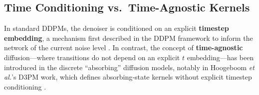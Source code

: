 \subsection{Time Conditioning vs.~Time-Agnostic Kernels}
In standard DDPMs, the denoiser is conditioned on an explicit \textbf{timestep embedding}, a mechanism first described in the DDPM framework to inform the network of the current noise level \cite{ho_denoising_2020}.  In contrast, the concept of \textbf{time-agnostic} diffusion—where transitions do not depend on an explicit $t$ embedding—has been introduced in the discrete “absorbing” diffusion models, notably in Hoogeboom \emph{et al.}’s D3PM work, which defines absorbing‐state kernels without explicit timestep conditioning \cite{hoogeboom_structured_2021}.

